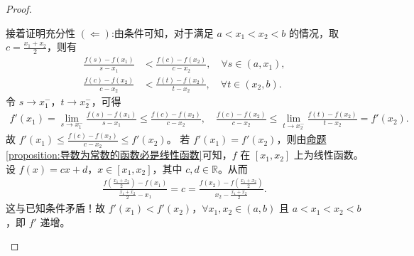 \documentclass[../../main.tex]{subfiles}
\begin{document}
\begin{proof}
\begin{enumerate}[(1)]
接着证明充分性 $(\Leftarrow)$:由条件可知，对于满足 \(a < x_1 < x_2 < b\) 的情况，取 \(c = \frac{x_1 + x_2}{2}\)，则有
\begin{align*}
\frac{f(s) - f(x_1)}{s - x_1} &< \frac{f(c) - f(x_2)}{c - x_2}, \quad \forall s \in (a, x_1), \\
\frac{f(c) - f(x_2)}{c - x_2} &< \frac{f(t) - f(x_2)}{t - x_2}, \quad \forall t \in (x_2, b).
\end{align*}
令 \(s \to x_1^-\)，\(t \to x_2^-\)，可得
\begin{align*}
f'(x_1) = \lim_{s \to x_1^-} \frac{f(s) - f(x_1)}{s - x_1} \leqslant \frac{f(c) - f(x_2)}{c - x_2}, \quad
\frac{f(c) - f(x_2)}{c - x_2} \leqslant \lim_{t \to x_2^-} \frac{f(t) - f(x_2)}{t - x_2} = f'(x_2).
\end{align*}
故 \(f'(x_1) \leqslant \frac{f(c) - f(x_2)}{c - x_2} \leqslant f'(x_2)\)。
若 \(f'(x_1) = f'(x_2)\)，则由\hyperref[proposition:导数为常数的函数必是线性函数]{命题\ref{proposition:导数为常数的函数必是线性函数}}可知，\(f\) 在 \([x_1, x_2]\) 上为线性函数。设 \(f(x) = cx + d\)，\(x \in [x_1, x_2]\)，其中 \(c, d \in \mathbb{R}\)。从而
\begin{align*}
\frac{f\left(\frac{x_1 + x_2}{2}\right) - f(x_1)}{\frac{x_1 + x_2}{2} - x_1} = c = \frac{f(x_2) - f\left(\frac{x_1 + x_2}{2}\right)}{x_2 - \frac{x_1 + x_2}{2}}.
\end{align*}
这与已知条件矛盾！故 \(f'(x_1) < f'(x_2)\)，\(\forall x_1, x_2 \in (a, b)\) 且 \(a < x_1 < x_2 < b\)，即 \(f'\) 递增。   
\end{enumerate}
\end{proof}
\end{document}

